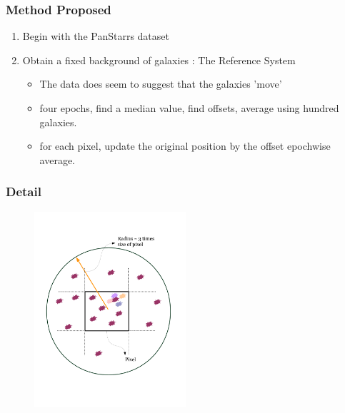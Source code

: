 \documentclass[10pt, compress]{beamer}
\begin{document}
\begin{frame}
\frametitle{Method Proposed}
	\begin{enumerate}
		\item Begin with the PanStarrs dataset
        \item Obtain a fixed background of galaxies : The Reference System
        	\begin{itemize}
				\item The data does seem to suggest that the galaxies 'move'
                \item four epochs, find a median value, find offsets, average using hundred galaxies.
                \item for each pixel, update the original position by the offset epochwise average.
               \end{itemize}
        
	\end{enumerate}
\end{frame}

\begin{frame}
\frametitle{Detail}
\begin{figure}\centering
\includegraphics[width=0.5\textwidth]{pixelRadiusMedianAndOthers.jpg}
\end{figure}

\end{frame}
\end{document}
